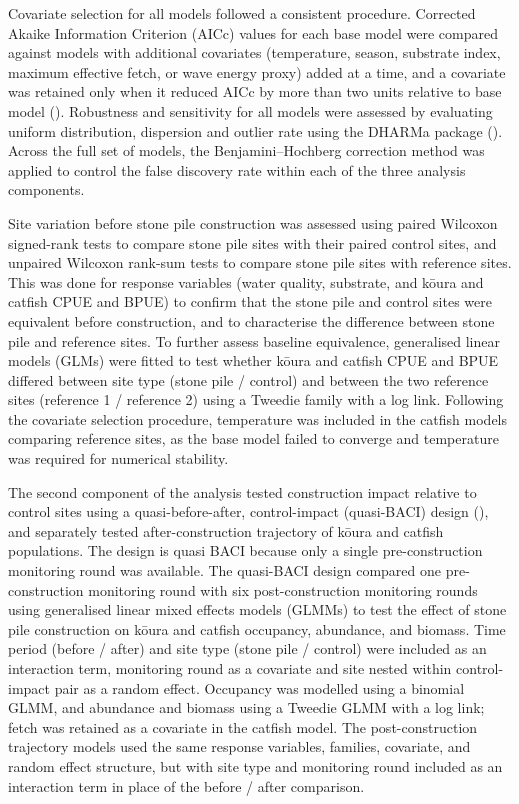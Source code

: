 \documentclass[
  letterpaper,
  DIV=11,
  numbers=noendperiod]{scrartcl}
\begin{document}
Covariate selection for all models followed a consistent procedure.
Corrected Akaike Information Criterion (AICc) values for each base model
were compared against models with additional covariates (temperature,
season, substrate index, maximum effective fetch, or wave energy proxy)
added at a time, and a covariate was retained only when it reduced AICc
by more than two units relative to base model
(). Robustness and
sensitivity for all models were assessed by evaluating uniform
distribution, dispersion and outlier rate using the DHARMa package
(). Across the full set of
models, the Benjamini--Hochberg correction method was applied to control
the false discovery rate within each of the three analysis components.

Site variation before stone pile construction was assessed using paired
Wilcoxon signed-rank tests to compare stone pile sites with their paired
control sites, and unpaired Wilcoxon rank-sum tests to compare stone
pile sites with reference sites. This was done for response variables
(water quality, substrate, and kōura and catfish CPUE and BPUE) to
confirm that the stone pile and control sites were equivalent before
construction, and to characterise the difference between stone pile and
reference sites. To further assess baseline equivalence, generalised
linear models (GLMs) were fitted to test whether kōura and catfish CPUE
and BPUE differed between site type (stone pile / control) and between
the two reference sites (reference 1 / reference 2) using a Tweedie
family with a log link. Following the covariate selection procedure,
temperature was included in the catfish models comparing reference
sites, as the base model failed to converge and temperature was required
for numerical stability.

The second component of the analysis tested construction impact relative
to control sites using a quasi-before-after, control-impact (quasi-BACI)
design (), and separately
tested after-construction trajectory of kōura and catfish populations.
The design is quasi BACI because only a single pre-construction
monitoring round was available. The quasi-BACI design compared one
pre-construction monitoring round with six post-construction monitoring
rounds using generalised linear mixed effects models (GLMMs) to test the
effect of stone pile construction on kōura and catfish occupancy,
abundance, and biomass. Time period (before / after) and site type
(stone pile / control) were included as an interaction term, monitoring
round as a covariate and site nested within control-impact pair as a
random effect. Occupancy was modelled using a binomial GLMM, and
abundance and biomass using a Tweedie GLMM with a log link; fetch was
retained as a covariate in the catfish model. The post-construction
trajectory models used the same response variables, families, covariate,
and random effect structure, but with site type and monitoring round
included as an interaction term in place of the before / after
comparison.
\end{document}
